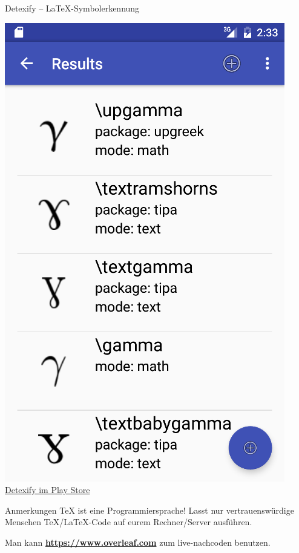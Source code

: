 \documentclass{beamer}
\begin{document}
\begin{frame}{Detexify -- \LaTeX-Symbolerkennung}
\begin{minipage}{0.45\textwidth}
\begin{center}
			\includegraphics[height=0.48\textheight]{images/detexify-app2}
			\vspace{0.5cm}
			\Large \href{https://play.google.com/store/apps/details?id=website.marty.detexify}{Detexify im Play Store}
			\end{center}
		\end{minipage}
				
		\end{frame}

		
		
		\begin{frame}{Anmerkungen}
			 \TeX{} ist eine Programmiersprache! Lasst nur vertrauenswürdige
			Menschen \TeX/\LaTeX-Code auf eurem Rechner/Server ausführen.
			
			\vspace{0.2cm}
			 Man kann \textbf{\url{https://www.overleaf.com}} zum live-nachcoden benutzen.
		\end{frame}
		
\end{document}
